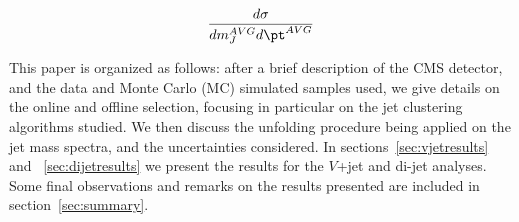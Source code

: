 \begin{equation}
\label{eq:dsigmadmjet}
\frac{d\sigma}{dm_J^{AVG} d\pt^{AVG}}
\end{equation}

This paper is organized as follows: after a brief description of the CMS detector, and the data and Monte Carlo (MC) simulated samples used, we give details on the online and offline selection, focusing in particular on the jet clustering algorithms studied. We then discuss the unfolding procedure being applied on the  jet mass spectra, and the uncertainties considered. In sections~\ref{sec:vjetresults}  and ~\ref{sec:dijetresults} we present the results for the $V$+jet and di-jet analyses. Some final observations and remarks on the results presented are included in section~\ref{sec:summary}.   
 
